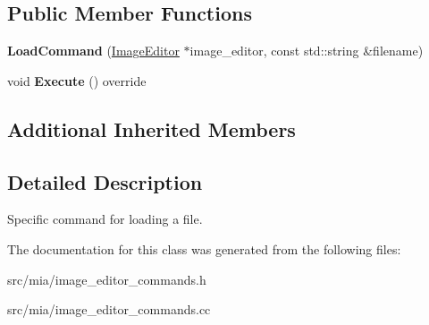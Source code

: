 \subsection*{Public Member Functions}
\begin{DoxyCompactItemize}
\item 
\mbox{\label{classimage__tools_1_1LoadCommand_a713b9437101305d112320436afc351dd}} 
{\bfseries Load\+Command} (\hyperlink{classimage__tools_1_1ImageEditor}{Image\+Editor} $\ast$image\+\_\+editor, const std\+::string \&filename)
\item 
\mbox{\label{classimage__tools_1_1LoadCommand_ad0fcc08b3946955ece01a14e961815a7}} 
void {\bfseries Execute} () override
\end{DoxyCompactItemize}
\subsection*{Additional Inherited Members}


\subsection{Detailed Description}
Specific command for loading a file. 

The documentation for this class was generated from the following files\+:\begin{DoxyCompactItemize}
\item 
src/mia/image\+\_\+editor\+\_\+commands.\+h\item 
src/mia/image\+\_\+editor\+\_\+commands.\+cc\end{DoxyCompactItemize}

